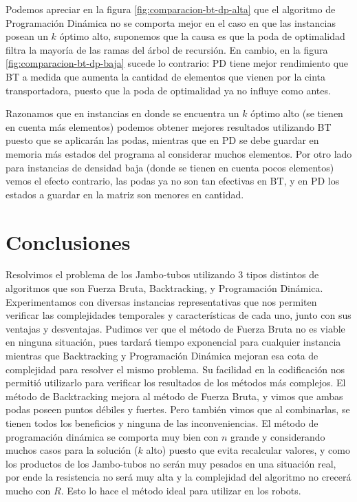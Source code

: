\documentclass[10pt,a4paper]{article}
\begin{document}
Podemos apreciar en la figura \ref{fig:comparacion-bt-dp-alta} que el algoritmo de Programación Dinámica no se comporta mejor en el caso en que las instancias posean un $k$ óptimo alto, suponemos que la causa es que la poda de optimalidad filtra la mayoría de las ramas del árbol de recursión.
En cambio, en la figura \ref{fig:comparacion-bt-dp-baja} sucede lo contrario: PD tiene mejor rendimiento que BT a medida que aumenta la cantidad de elementos que vienen por la cinta transportadora, puesto que la poda de optimalidad ya no influye como antes.

Razonamos que en instancias en donde se encuentra un $k$ óptimo alto (se tienen en cuenta más elementos) podemos obtener mejores resultados utilizando BT puesto que se aplicarán las podas, mientras que en PD se debe guardar en memoria más estados del programa al considerar muchos elementos. Por otro lado para instancias de densidad baja (donde se tienen en cuenta pocos elementos) vemos el efecto contrario, las podas ya no son tan efectivas en BT, y en PD los estados a guardar en la matriz son menores en cantidad.

\newpage

\section{Conclusiones} \label{sec:conclusiones}
Resolvimos el problema de los Jambo-tubos utilizando 3 tipos distintos de algoritmos que son Fuerza Bruta, Backtracking, y Programación Dinámica. Experimentamos con diversas instancias representativas que nos permiten verificar las complejidades temporales y características de cada uno, junto con sus ventajas y desventajas.
Pudimos ver que el método de Fuerza Bruta no es viable en ninguna situación, pues tardará tiempo exponencial para cualquier instancia mientras que Backtracking y Programación Dinámica mejoran esa cota de complejidad para resolver el mismo problema. Su facilidad en la codificación nos permitió utilizarlo para verificar los resultados de los métodos más complejos.
El método de Backtracking mejora al método de Fuerza Bruta, y vimos que ambas podas poseen puntos débiles y fuertes. Pero también vimos que al combinarlas, se tienen todos los beneficios y ninguna de las inconveniencias.
El método de programación dinámica se comporta muy bien con $n$ grande y considerando muchos casos para la solución ($k$ alto) puesto que evita recalcular valores, y como los productos de los Jambo-tubos no serán muy pesados en una situación real, por ende la resistencia no será muy alta y la complejidad del algoritmo no crecerá mucho con $R$. Esto lo hace el método ideal para utilizar en los robots.

\newpage
\nocite{*}
\end{document}

